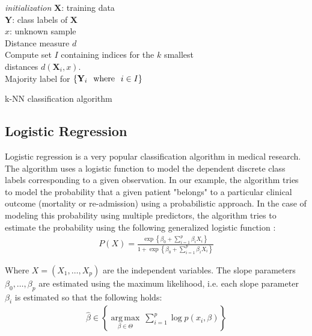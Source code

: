 \documentclass[../thesis.tex]{subfiles}
\begin{document}
\begin{algorithm}[H]{
\SetAlgoLined
\textit{initialization}\;
    \hspace{0.5cm} $\mathbf{X}$: training data\\
    \hspace{0.5cm} $\mathbf{Y}$: class labels of $\mathbf{X}$\\
    \hspace{0.5cm} $x$: unknown sample\\
    \hspace{0.5cm} Distance measure $d$\\
    Compute set $I$ containing indices for the $k$ smallest\\
    \hspace*{0,5cm}distances $d(\mathbf{X}_i, x)$.\\
    \Return Majority label for $\left\{ \mathbf{Y}_i \hspace{0.25cm} \text{where} \hspace{0.25cm} i \in I \right\}$
}
\caption{k-NN classification algorithm}
\end{algorithm}


\subsection{Logistic Regression}
\label{subsec:logr}

\noindent Logistic regression is a very popular classification algorithm in medical research. The algorithm uses a logistic function to model the dependent discrete class labels corresponding to a given observation. In our example, the algorithm tries to model the probability that a given patient "belongs" to a particular clinical outcome (mortality or re-admission) using a probabilistic approach. In the case of modeling this probability using multiple predictors, the algorithm tries to estimate the probability using the following generalized logistic function \citep{friedman2009elements}:
\begin{align}
    P(X) = \frac{\exp \left\{\beta_0 + \sum_{i=1}^p\beta_iX_i \right\}}{1 +\exp \left\{\beta_0 + \sum_{i=1}^p\beta_iX_i \right\}}
    \label{eq:logr}
\end{align}

\noindent Where $X = \left(X_1, \hdots, X_p \right)$ are the independent variables. The slope parameters $\beta_0, \hdots, \beta_p$ are estimated using the maximum likelihood, i.e. each slope parameter $\beta_i$ is estimated so that the following holds:
\newpage
\begin{align}
    \hat{\beta} \in \left\{ {\underset {\beta \in \Theta }{\operatorname {arg\,max} }}\ \sum_{i=1}^p\log p(x_i, \beta)\right\}
\end{align}
\end{document}
